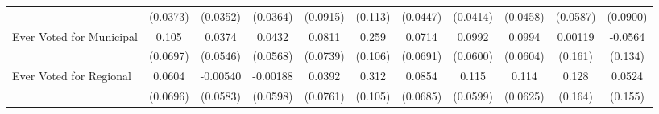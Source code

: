 {\begin{tabular}{l*{10}{c}}
            &    (0.0373)         &    (0.0352)         &    (0.0364)         &    (0.0915)         &     (0.113)         &    (0.0447)         &    (0.0414)         &    (0.0458)         &    (0.0587)         &    (0.0900)         \\
\addlinespace
Ever Voted for Municipal&       0.105         &      0.0374         &      0.0432         &      0.0811         &       0.259\sym{*}  &      0.0714         &      0.0992         &      0.0994         &     0.00119         &     -0.0564         \\
            &    (0.0697)         &    (0.0546)         &    (0.0568)         &    (0.0739)         &     (0.106)         &    (0.0691)         &    (0.0600)         &    (0.0604)         &     (0.161)         &     (0.134)         \\
\addlinespace
Ever Voted for Regional&      0.0604         &    -0.00540         &    -0.00188         &      0.0392         &       0.312\sym{**} &      0.0854         &       0.115         &       0.114         &       0.128         &      0.0524         \\
            &    (0.0696)         &    (0.0583)         &    (0.0598)         &    (0.0761)         &     (0.105)         &    (0.0685)         &    (0.0599)         &    (0.0625)         &     (0.164)         &     (0.155)         \\
\bottomrule
\end{tabular}
}
